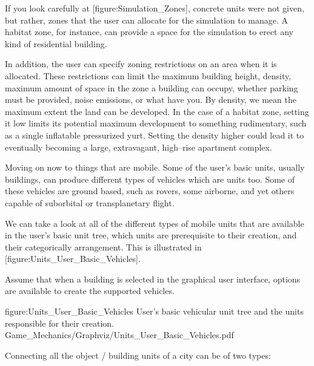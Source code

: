 \page
{}
    {}
    
    {}

If you look carefully at [figure:Simulation_Zones], concrete units were not given, but rather, zones that the user can allocate for the simulation to manage. A habitat zone, for instance, can provide a space for the simulation to erect any kind of residential building. 

In addition, the user can specify zoning restrictions on an area when it is allocated. These restrictions can limit the maximum building height, density, maximum amount of space in the zone a building can occupy, whether parking must be provided, noise emissions, or what have you. By density, we mean the maximum extent the land can be developed. In the case of a habitat zone, setting it low limits its potential maximum development to something rudimentary, such as a single inflatable pressurized yurt. Setting the density higher could lead it to eventually becoming a large, extravagant, high--rise apartment complex.

Moving on now to things that are mobile. Some of the user's basic units, usually buildings, can produce different types of vehicles which are units too. Some of these vehicles are ground based, such as rovers, some airborne, and yet others capable of suborbital or transplanetary flight.

We can take a look at all of the different types of mobile units that are available in the user's basic unit tree, which units are prerequisite to their creation, and their categorically arrangement. This is illustrated in [figure:Units_User_Basic_Vehicles]. 

Assume that when a building is selected in the graphical user interface, options are available to create the supported vehicles.

\FullPageDiagram
    {figure:Units_User_Basic_Vehicles}
    {User's basic vehicular unit tree and the units responsible for their creation.}
    {Game_Mechanics/Graphviz/Units_User_Basic_Vehicles.pdf}


Connecting all the object / building units of a city can be of two types:

